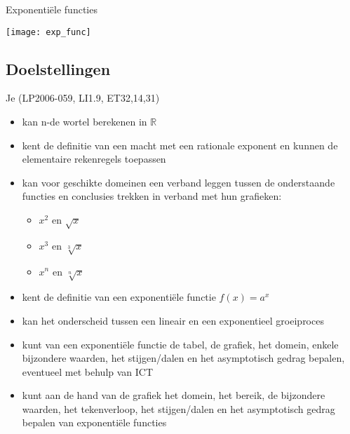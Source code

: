 \documentclass[12pt,twoside]{article}
\begin{document}
\begin{center}
  \begin{mdframed}
    \centering
    \fontsize{40}{60}\selectfont Exponentiële functies
  \end{mdframed}
  \vfill
  \texttt{[image: exp\_func]} %
  \vfill
\end{center}

\subsection*{Doelstellingen}
\vspace*{-0.8cm}
\begin{singlespacing}
  Je \hfill  {\scriptsize(LP2006-059, LI1.9, ET32,14,31)}
  \begin{itemize}
    \itemsep-0.2em
  \item kan n-de wortel berekenen in $\mathbb{R}$
  \item kent de definitie van een macht met een rationale exponent en kunnen de elementaire rekenregels toepassen
  \item kan voor geschikte domeinen een verband leggen tussen de onderstaande functies en conclusies trekken in verband met hun grafieken:
    \begin{itemize}
    \item $x^2$ en $\sqrt{x}$
    \item $x^3$ en $\sqrt[3]{x}$
    \item $x^n$ en $\sqrt[n]{x}$
    \end{itemize}
  \item kent de definitie van een exponentiële functie $f(x)=a^x$
  \item kan het onderscheid tussen een lineair en een exponentieel groeiproces
  \item kunt van een exponentiële functie de tabel, de grafiek, het domein, enkele bijzondere waarden, het stijgen/dalen en het asymptotisch gedrag bepalen, eventueel met behulp van ICT
  \item kunt aan de hand van de grafiek het domein, het bereik, de bijzondere waarden, het tekenverloop, het stijgen/dalen en het asymptotisch gedrag bepalen van exponentiële functies
  \end{itemize}
\end{singlespacing}

\thispagestyle{empty}
\newpage

\tableofcontents

\vfill
\end{document}

